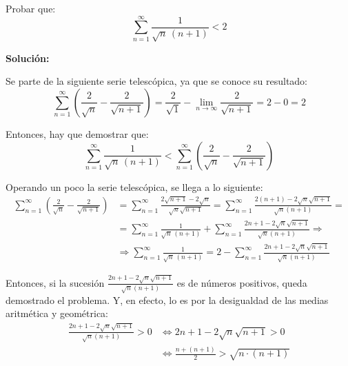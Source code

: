 \documentclass[../../main.tex]{subfiles}
\begin{document}
  \begin{shaded}
    Probar que:
    $$
    \sum_{n = 1}^\infty \frac{1}{\sqrt{n} \, (n + 1)} < 2
    $$
  \end{shaded}

  \textbf{Solución:}

  Se parte de la siguiente serie telescópica, ya que se conoce su resultado:
  $$
  \sum_{n = 1}^\infty \left(\frac{2}{\sqrt{n}} - \frac{2}{\sqrt{n + 1}} \right) = \frac{2}{\sqrt{1}} - \lim_{n \to \infty} \frac{2}{\sqrt{n + 1}} = 2 - 0 = 2
  $$

  Entonces, hay que demostrar que:
  $$
  \sum_{n = 1}^\infty \frac{1}{\sqrt{n} \, (n + 1)} < \sum_{n = 1}^\infty \left(\frac{2}{\sqrt{n}} - \frac{2}{\sqrt{n + 1}} \right)
  $$

  Operando un poco la serie telescópica, se llega a lo siguiente:
  \begin{equation*}
    \begin{split}
      \sum_{n = 1}^\infty \left(\frac{2}{\sqrt{n}} - \frac{2}{\sqrt{n + 1}} \right) &= \sum_{n = 1}^\infty \frac{2\sqrt{n + 1} - 2\sqrt{n}}{\sqrt{n} \sqrt{n + 1}} = \sum_{n = 1}^\infty \frac{2(n + 1) - 2\sqrt{n}\sqrt{n + 1}}{\sqrt{n} (n + 1)} =
      \\
      & =
      \sum_{n = 1}^\infty \frac{1}{\sqrt{n} \, (n + 1)} + \sum_{n = 1}^\infty \frac{2n + 1 - 2\sqrt{n}\sqrt{n + 1}}{\sqrt{n} (n + 1)} \Longrightarrow
      \\
      & \Longrightarrow \sum_{n = 1}^\infty \frac{1}{\sqrt{n} \, (n + 1)} = 2 - \sum_{n = 1}^\infty \frac{2n + 1 - 2\sqrt{n}\sqrt{n + 1}}{\sqrt{n} (n + 1)}
    \end{split}
  \end{equation*}

  Entonces, si la sucesión $\displaystyle\frac{2n + 1 - 2\sqrt{n}\sqrt{n + 1}}{\sqrt{n} (n + 1)}$ es de números positivos, queda demostrado el problema. Y, en efecto, lo es por la desigualdad de las medias aritmética y geométrica:
  \begin{equation*}
    \begin{split}
      \frac{2n + 1 - 2\sqrt{n}\sqrt{n + 1}}{\sqrt{n} (n + 1)} > 0 & \iff
      2n + 1 - 2\sqrt{n}\sqrt{n + 1} > 0 \\ & \iff
      \frac{n + (n + 1)}{2} > \sqrt{n \cdot (n + 1)}
    \end{split}
  \end{equation*}
\end{document}
